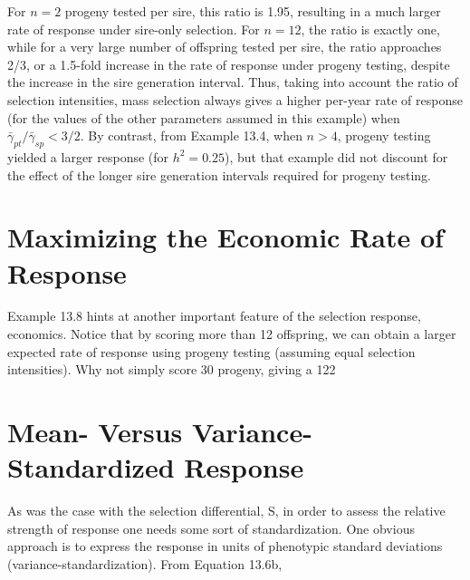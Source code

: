 \documentclass{article}
\begin{document}
For $n = 2$ progeny tested per sire, this ratio is 1.95, resulting in a much larger rate of response under sire-only selection. For $n = 12$, the ratio is exactly one, while for a very large number of offspring tested per sire, the ratio approaches 2/3, or a 1.5-fold increase in the rate of response under progeny testing, despite the increase in the sire generation interval. Thus, taking into account the ratio of selection intensities, mass selection always gives a higher per-year rate of response (for the values of the other parameters assumed in this example) when $\bar{\gamma}_{pt}/\bar{\gamma}_{sp} < 3/2$. By contrast, from Example 13.4, when $n > 4$, progeny testing yielded a larger response (for $h^2 = 0.25$), but that example did not discount for the effect of the longer sire generation intervals required for progeny testing.

\section{Maximizing the Economic Rate of Response}
Example 13.8 hints at another important feature of the selection response, economics. Notice that by scoring more than 12 offspring, we can obtain a larger expected rate of response using progeny testing (assuming equal selection intensities). Why not simply score 30 progeny, giving a 122%

\section{Mean- Versus Variance-Standardized Response}
As was the case with the selection differential, S, in order to assess the relative strength of response one needs some sort of standardization. One obvious approach is to express the response in units of phenotypic standard deviations (variance-standardization). From Equation 13.6b,
\end{document}
